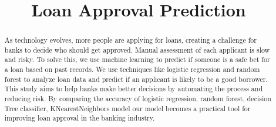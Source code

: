 \documentclass[conference]{IEEEtran}
\begin{document}
	
	\title{Loan Approval Prediction\\
	
	}
	\author{
		\and
		\and
		\and
	}
	
	\maketitle
	
	\begin{abstract}
	 
As technology evolves, more people are applying for loans, creating a challenge for banks to decide who should get approved. Manual assessment of each applicant is slow and risky\cite{p5}. To solve this, we use machine learning to predict if someone is a safe bet for a loan based on past records. We use techniques like logistic regression and random forest to analyze loan data and predict if an applicant is likely to be a good borrower. This study aims to help banks make better decisions by automating the process and reducing risk. By comparing the accuracy of logistic regression, random forest, decision Tree classifier, KNearestNeighbors model 
our model becomes a practical tool for improving loan approval in the banking industry.
\end{abstract}
\end{document}
